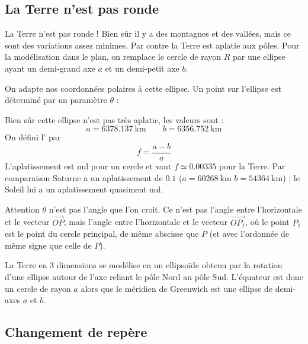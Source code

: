 \documentclass[class=report,crop=false]{standalone}
\newcommand{\vect}{\overrightarrow}
\begin{document}
\subsection{La Terre n'est pas ronde}

La Terre n'est pas ronde ! Bien sûr il y a des montagnes et des vallées, mais ce sont 
des variations assez minimes.
Par contre la Terre est aplatie aux pôles.
Pour la modélisation dans le plan, on remplace le cercle de rayon $R$ 
par une ellipse ayant un demi-grand axe $a$ et un demi-petit axe $b$.


On adapte nos coordonnées polaires à cette ellipse. Un point sur l'ellipse est déterminé
par un paramètre $\theta$ :

Bien sûr cette ellipse n'est pas très aplatie, les valeurs sont :
$$a = \SI{6378.137}{\kilo\meter} \qquad b = \SI{6356.752}{\kilo\meter}$$
On défini l' par 
$$f = \frac{a-b}{a}$$
L'aplatissement est nul pour un cercle et vaut $f \simeq \num{0.00335}$ pour la Terre.
Par comparaison Saturne a un aplatissement de $\num{0.1}$
($a= \SI{60268}{\kilo\meter}$ $b=\SI{54364}{\kilo\meter}$) ; le Soleil lui a un aplatissement quasiment nul.



Attention $\theta$ n'est pas l'angle que l'on croit. Ce n'est pas l'angle entre l'horizontale
et le vecteur $\vect{OP}$, mais l'angle entre l'horizontale et le vecteur 
$\vect{OP_1}$, où le point $P_1$ est le point du cercle principal, de même abscisse que $P$
(et avec l'ordonnée de même signe que celle de $P$).


La Terre en $3$ dimensions se modélise en un ellipsoïde obtenu 
par la rotation d'une ellipse autour de l'axe reliant le pôle Nord au pôle Sud.
L'équateur est donc un cercle de rayon $a$ alors que le méridien de Greenwich
est une ellipse de demi-axes $a$ et $b$.


\subsection{Changement de repère}
\end{document}
